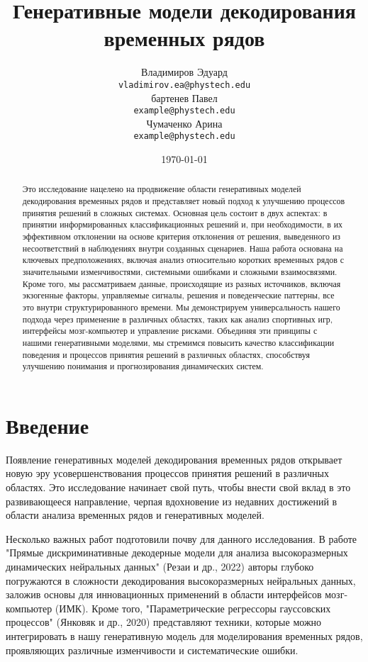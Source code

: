 \documentclass[a4paper, 12pt]{article}
\title{Генеративные модели декодирования временных рядов}
\author{Владимиров Эдуард \\
	\texttt{vladimirov.ea@phystech.edu} \\	
	\And
	бартенев Павел \\
	\texttt{example@phystech.edu} \\
	\And
	Чумаченко Арина \\
	\texttt{example@phystech.edu}
}
\date{\today}
\begin{document}
\maketitle

\begin{abstract}
	Это исследование нацелено на продвижение области генеративных моделей декодирования временных рядов и представляет новый подход к улучшению процессов принятия решений в сложных системах. Основная цель состоит в двух аспектах: в принятии информированных классификационных решений и, при необходимости, в их эффективном отклонении на основе критерия отклонения от решения, выведенного из несоответствий в наблюдениях внутри созданных сценариев. Наша работа основана на ключевых предположениях, включая анализ относительно коротких временных рядов с значительными изменчивостями, системными ошибками и сложными взаимосвязями. Кроме того, мы рассматриваем данные, происходящие из разных источников, включая экзогенные факторы, управляемые сигналы, решения и поведенческие паттерны, все это внутри структурированного времени. Мы демонстрируем универсальность нашего подхода через применение в различных областях, таких как анализ спортивных игр, интерфейсы мозг-компьютер и управление рисками. Объединяя эти принципы с нашими генеративными моделями, мы стремимся повысить качество классификации поведения и процессов принятия решений в различных областях, способствуя улучшению понимания и прогнозирования динамических систем.
\end{abstract}



\section{Введение}
	Появление генеративных моделей декодирования временных рядов открывает новую эру усовершенствования процессов принятия решений в различных областях. Это исследование начинает свой путь, чтобы внести свой вклад в это развивающееся направление, черпая вдохновение из недавних достижений в области анализа временных рядов и генеративных моделей.
	
	Несколько важных работ подготовили почву для данного исследования. В работе "Прямые дискриминативные декодерные модели для анализа высокоразмерных динамических нейральных данных" (Резаи и др., 2022) авторы глубоко погружаются в сложности декодирования высокоразмерных нейральных данных, заложив основы для инновационных применений в области интерфейсов мозг-компьютер (ИМК). Кроме того, "Параметрические регрессоры гауссовских процессов" (Янковяк и др., 2020) представляют техники, которые можно интегрировать в нашу генеративную модель для моделирования временных рядов, проявляющих различные изменчивости и систематические ошибки.
	
\end{document}
